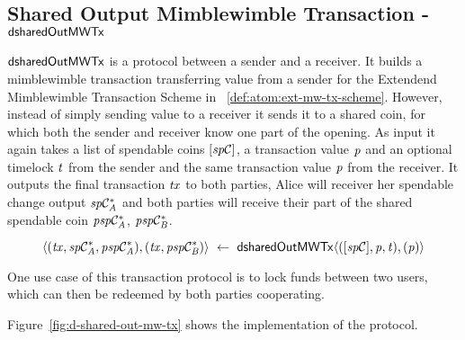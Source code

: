 \subsection{Shared Output Mimblewimble Transaction - $\mathsf{dsharedOutMWTx}$} \label{subsec:atom:shared-out-mw-tx}

$\mathsf{dsharedOutMWTx}$ is a protocol between a sender and a receiver.
It builds a mimblewimble transaction transferring value from a sender for the Extendend Mimblewimble Transaction Scheme in ~\ref{def:atom:ext-mw-tx-scheme}.
However, instead of simply sending value to a receiver it sends it to a shared coin, for which both the sender and receiver know one part of the opening.
As input it again takes a list of spendable coins $[\mathit{sp}\mathcal{C}]$, a transaction value $\mathit{p}$ and an optional timelock $\mathit{t}$ from the sender and the same transaction value $\mathit{p}$ from the receiver.
It outputs the final transaction $\mathit{tx}$ to both parties, Alice will receiver her spendable change output $\mathit{sp}\mathcal{C}_{\mathit{A}}^*$ and both parties will receive their part of the shared spendable coin $\mathit{psp}\mathcal{C}_{\mathit{A}}^*$, $\mathit{psp}\mathcal{C}_{\mathit{B}}^*$.

\[ \langle (\mathit{tx}, \mathit{sp}\mathcal{C}_{\mathit{A}}^*, \mathit{psp}\mathcal{C}_{\mathit{A}}^*), (\mathit{tx}, \mathit{psp}\mathcal{C}_{\mathit{B}}^*) \rangle ~\leftarrow~ \mathsf{dsharedOutMWTx} \langle([\mathit{sp}\mathcal{C}],\mathit{p},\mathit{t}), (\mathit{p}) \rangle \]

One use case of this transaction protocol is to lock funds between two users, which can then be redeemed by both parties cooperating.

Figure~\ref{fig:d-shared-out-mw-tx} shows the implementation of the protocol.

